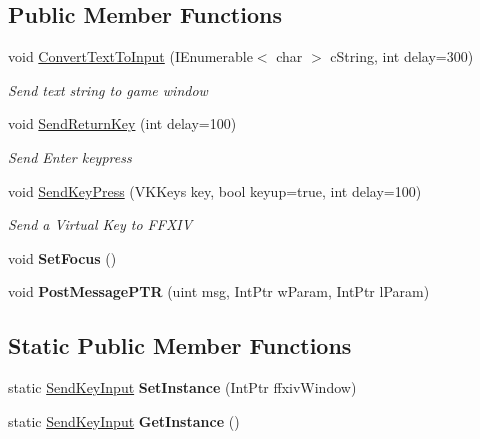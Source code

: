 \subsection*{Public Member Functions}
\begin{DoxyCompactItemize}
\item 
void \hyperlink{classffxivlib_1_1_send_key_input_aa8f7cbdf5bafad8f57313b1bd5731cf4}{Convert\-Text\-To\-Input} (I\-Enumerable$<$ char $>$ c\-String, int delay=300)
\begin{DoxyCompactList}\small\item\em Send text string to game window \end{DoxyCompactList}\item 
void \hyperlink{classffxivlib_1_1_send_key_input_a3302a44e82c7edee92ad9ceacce87fa6}{Send\-Return\-Key} (int delay=100)
\begin{DoxyCompactList}\small\item\em Send Enter keypress \end{DoxyCompactList}\item 
void \hyperlink{classffxivlib_1_1_send_key_input_a929f24cc17ff7ef019f13dcf4ed24805}{Send\-Key\-Press} (V\-K\-Keys key, bool keyup=true, int delay=100)
\begin{DoxyCompactList}\small\item\em Send a Virtual Key to F\-F\-X\-I\-V \end{DoxyCompactList}\item 
\hypertarget{classffxivlib_1_1_send_key_input_aec916a6b910122da2683c311b2cacb67}{void {\bfseries Set\-Focus} ()}\label{classffxivlib_1_1_send_key_input_aec916a6b910122da2683c311b2cacb67}

\item 
\hypertarget{classffxivlib_1_1_send_key_input_ad8abc46b579a90effb462da85f54046b}{void {\bfseries Post\-Message\-P\-T\-R} (uint msg, Int\-Ptr w\-Param, Int\-Ptr l\-Param)}\label{classffxivlib_1_1_send_key_input_ad8abc46b579a90effb462da85f54046b}

\end{DoxyCompactItemize}
\subsection*{Static Public Member Functions}
\begin{DoxyCompactItemize}
\item 
\hypertarget{classffxivlib_1_1_send_key_input_ac361080c20631c135489b06e4ecdf358}{static \hyperlink{classffxivlib_1_1_send_key_input}{Send\-Key\-Input} {\bfseries Set\-Instance} (Int\-Ptr ffxiv\-Window)}\label{classffxivlib_1_1_send_key_input_ac361080c20631c135489b06e4ecdf358}

\item 
\hypertarget{classffxivlib_1_1_send_key_input_a79307c1693981a786db6eca2faa584b7}{static \hyperlink{classffxivlib_1_1_send_key_input}{Send\-Key\-Input} {\bfseries Get\-Instance} ()}\label{classffxivlib_1_1_send_key_input_a79307c1693981a786db6eca2faa584b7}

\end{DoxyCompactItemize}
